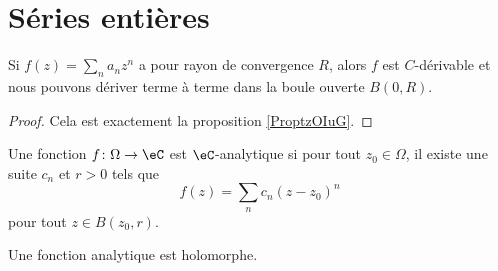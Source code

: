 \section{Séries entières}
\label{SecoLNvnO}

\begin{proposition}     \label{PropRZCKeO}
    Si \( f(z)=\sum_na_nz^n\) a pour rayon de convergence \( R\), alors \( f\) est $C$-dérivable et nous pouvons dériver terme à terme dans la boule ouverte \( B(0,R)\).
\end{proposition}

\begin{proof}
    Cela est exactement la proposition \ref{ProptzOIuG}.
\end{proof}

\begin{definition}
    Une fonction \( f\colon \Omega\to \eC\) est \( \eC\)-analytique si pour tout \( z_0\in\Omega\), il existe une suite \( c_n\) et \( r>0\) tels que
    \begin{equation}
        f(z)=\sum_n c_n(z-z_0)^n
    \end{equation}
    pour tout \( z\in B(z_0,r)\).
\end{definition}

\begin{proposition}
    Une fonction analytique est holomorphe.
\end{proposition}



